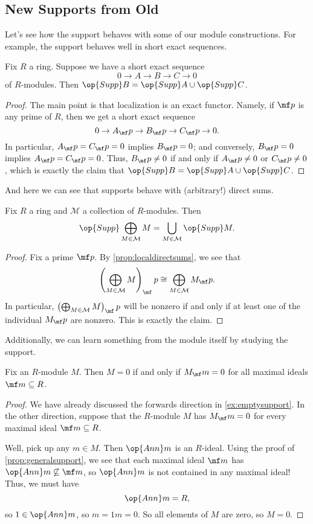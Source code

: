 \subsection{New Supports from Old}
Let's see how the support behaves with some of our module constructions. For example, the support behaves well in short exact sequences.
\begin{proposition} \label{prop:suppses}
	Fix $R$ a ring. Suppose we have a short exact sequence
	\[0\to A\to B\to C\to 0\]
	of $R$-modules. Then $\op{Supp}B=\op{Supp}A\cup\op{Supp}C$.
\end{proposition}
\begin{proof}
	The main point is that localization is an exact functor. Namely, if $\mf p$ is any prime of $R$, then we get a short exact sequence
	\[0\to A_\mf p\to B_\mf p\to C_\mf p\to0.\]
	In particular, $A_\mf p=C_\mf p=0$ implies $B_\mf p=0$; and conversely, $B_\mf p=0$ implies $A_\mf p=C_\mf p=0$. Thus, $B_\mf p\ne0$ if and only if $A_\mf p\ne0$ or $C_\mf p\ne0$, which is exactly the claim that $\op{Supp}B=\op{Supp}A\cup\op{Supp}C$.
\end{proof}
And here we can see that supports behave with (arbitrary!) direct sums.
\begin{proposition}
	Fix $R$ a ring and $\mathcal M$ a collection of $R$-modules. Then
	\[\op{Supp}\bigoplus_{M\in\mathcal M}M=\bigcup_{M\in\mathcal M}\op{Supp}M.\]
\end{proposition}
\begin{proof}
	Fix a prime $\mf p$. By \autoref{prop:localdirectsums}, we see that
	\[\left(\bigoplus_{M\in\mathcal M}M\right)_\mf p\cong\bigoplus_{M\in\mathcal M}M_\mf p.\]
	In particular, $\left(\bigoplus_{M\in\mathcal M}M\right)_\mf p$ will be nonzero if and only if at least one of the individual $M_\mf p$ are nonzero. This is exactly the claim.
\end{proof}
Additionally, we can learn something from the module itself by studying the support.
\begin{proposition}
	Fix an $R$-module $M$. Then $M=0$ if and only if $M_\mf m=0$ for all maximal ideals $\mf m\subseteq R$.
\end{proposition}
\begin{proof}
	We have already discussed the forwards direction in \autoref{ex:emptysupport}. In the other direction, suppose that the $R$-module $M$ has $M_\mf m=0$ for every maximal ideal $\mf m\subseteq R$.

	Well, pick up any $m\in M$. Then $\op{Ann}m$ is an $R$-ideal. Using the proof of \autoref{prop:generalsupport}, we see that each maximal ideal $\mf m$ has $\op{Ann}m\not\subseteq\mf m$, so $\op{Ann}m$ is not contained in any maximal ideal! Thus, we must have
	\[\op{Ann}m=R,\]
	so $1\in\op{Ann}m$, so $m=1m=0$. So all elements of $M$ are zero, so $M=0$.
\end{proof}
